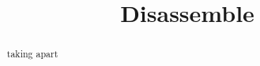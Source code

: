 \documentclass{ximera}
\title{Disassemble}
\begin{document}
\begin{abstract}
taking apart
\end{abstract}
\maketitle
\end{document}
